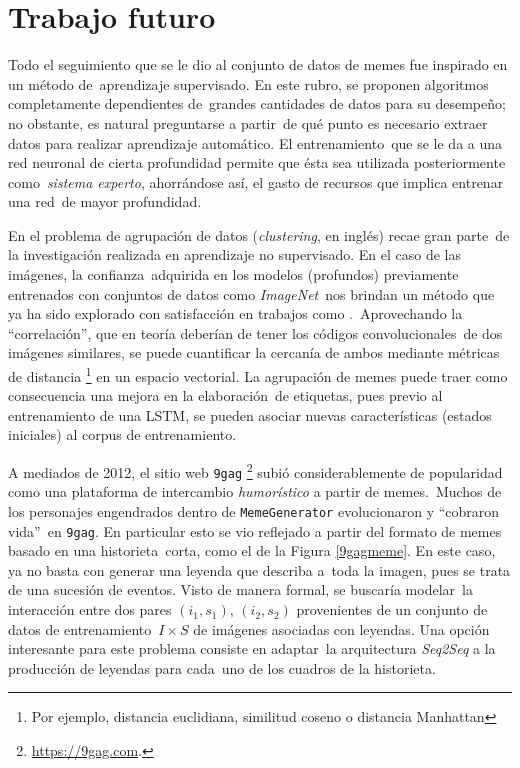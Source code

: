 \section{Trabajo futuro}

\noindent
Todo el seguimiento que se le dio al conjunto de datos de memes fue inspirado en un método de\
aprendizaje supervisado. En este rubro, se proponen algoritmos completamente dependientes de\
grandes cantidades de datos para su desempeño; no obstante, es natural preguntarse a partir\
de qué punto es necesario extraer datos para realizar aprendizaje automático. El entrenamiento\
que se le da a una red neuronal de cierta profundidad permite que ésta sea utilizada posteriormente como\
\emph{sistema experto}, ahorrándose así, el gasto de recursos que implica entrenar una red\
de mayor profundidad.\par
En el problema de agrupación de datos (\emph{clustering}, en inglés) recae gran parte\
de la investigación realizada en aprendizaje no supervisado. En el caso de las imágenes, la confianza\
adquirida en los modelos (profundos) previamente entrenados con conjuntos de datos como \emph{ImageNet}\
nos brindan un método que ya ha sido explorado con satisfacción en trabajos como \cite{DBLP:journals/corr/DundarJC15}.\
Aprovechando la ``correlación'', que en teoría deberían de tener los códigos convolucionales\
de dos imágenes similares, se puede cuantificar la cercanía de ambos mediante métricas de distancia%
\footnote{
  Por ejemplo, distancia euclidiana, similitud coseno o distancia Manhattan
} en un espacio vectorial. La agrupación de memes puede traer como consecuencia una mejora en la elaboración\
de etiquetas, pues previo al entrenamiento de una LSTM, se pueden asociar nuevas características (estados iniciales)
al corpus de entrenamiento.\par
A mediados de 2012, el sitio web \verb+9gag+%
\footnote{
  \url{https://9gag.com}.
} subió considerablemente de popularidad como una plataforma de intercambio \emph{humorístico} a partir de memes.\
Muchos de los personajes engendrados dentro de \verb+MemeGenerator+ evolucionaron y ``cobraron vida''\
en \verb+9gag+. En particular esto se vio reflejado a partir del formato de memes basado en una historieta\
corta, como el de la Figura \ref{9gagmeme}. En este caso, ya no basta con generar una leyenda que describa a\
toda la imagen, pues se trata de una sucesión de eventos. Visto de manera formal, se buscaría modelar\
la interacción entre dos pares $(i_1, s_1)$, $(i_2, s_2)$ provenientes de un conjunto de datos de entrenamiento\
$I \times S$ de imágenes asociadas con leyendas. Una opción interesante para este problema consiste en adaptar\
la arquitectura \emph{Seq2Seq} \cite{DBLP:journals/corr/SutskeverVL14} a la producción de leyendas para cada\
uno de los cuadros de la historieta.


